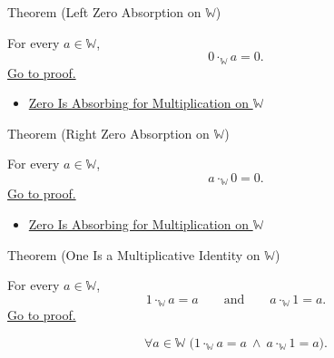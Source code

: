 \begin{theorembox}{Theorem (Left Zero Absorption on \texorpdfstring{$\mathbb{W}$}{W})}
\begin{theorem}
\label{thm:left-zero-absorption-on-w}
For every $a\in\mathbb{W}$,
\[
0\cdot_{\mathbb{W}}a=0.
\]
\hyperref[prf:left-zero-absorption-on-w]{Go to proof.}
\end{theorem}
\end{theorembox}

\begin{dependencies}
\begin{itemize}
  \item \hyperref[thm:zero-absorbing-for-multiplication-on-w]{Zero Is Absorbing for Multiplication on $\mathbb{W}$}
\end{itemize}
\end{dependencies}

\begin{theorembox}{Theorem (Right Zero Absorption on \texorpdfstring{$\mathbb{W}$}{W})}
\begin{theorem}
\label{thm:right-zero-absorption-on-w}
For every $a\in\mathbb{W}$,
\[
a\cdot_{\mathbb{W}}0=0.
\]
\hyperref[prf:right-zero-absorption-on-w]{Go to proof.}
\end{theorem}
\end{theorembox}

\begin{dependencies}
\begin{itemize}
  \item \hyperref[thm:zero-absorbing-for-multiplication-on-w]{Zero Is Absorbing for Multiplication on $\mathbb{W}$}
\end{itemize}
\end{dependencies}

\begin{theorembox}{Theorem (One Is a Multiplicative Identity on \texorpdfstring{$\mathbb{W}$}{W})}
\begin{theorem}
\label{thm:one-multiplicative-identity-on-w}
For every $a\in\mathbb{W}$,
\[
1\cdot_{\mathbb{W}}a=a
\qquad\text{and}\qquad
a\cdot_{\mathbb{W}}1=a.
\]
\hyperref[prf:one-multiplicative-identity-on-w]{Go to proof.}
\end{theorem}
\end{theorembox}

\begin{remark*}
\[
\forall a\in\mathbb{W}\;
\bigl(1\cdot_{\mathbb{W}}a=a\ \wedge\ a\cdot_{\mathbb{W}}1=a\bigr).
\]
\end{remark*}

